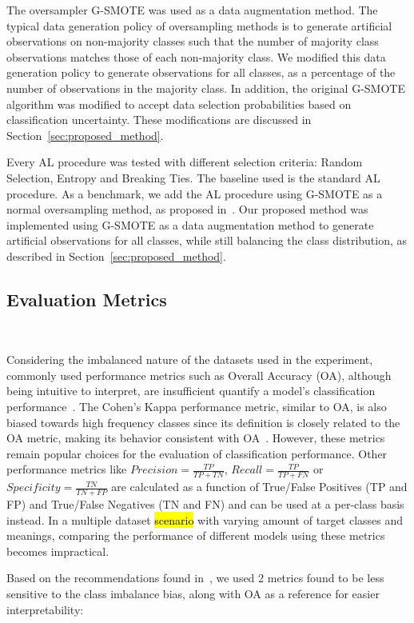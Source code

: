 \documentclass[preprint, 12pt]{elsarticle}
\begin{document}
The oversampler G-SMOTE was used as a data augmentation method. The typical
data generation policy of oversampling methods is to generate artificial
observations on non-majority classes such that the number of majority class
observations matches those of each non-majority class. We modified this data
generation policy to generate observations for all classes, as a percentage of
the number of observations in the majority class. In addition, the original
G-SMOTE algorithm was modified to accept data selection probabilities based on
classification uncertainty. These modifications are discussed in
Section~\ref{sec:proposed_method}.

Every AL procedure was tested with different selection criteria: Random
Selection, Entropy and Breaking Ties. The baseline used is the standard AL
procedure. As a benchmark, we add the AL procedure using G-SMOTE as a normal
oversampling method, as proposed in~\cite{Fonseca2021}. Our proposed method
was implemented using G-SMOTE as a data augmentation method to generate
artificial observations for all classes, while still balancing the class
distribution, as described in Section~\ref{sec:proposed_method}. 
 
\subsection{Evaluation Metrics}~\label{sec:evaluation_metrics}

Considering the imbalanced nature of the datasets used in the experiment,
commonly used performance metrics such as Overall Accuracy (OA), although
being intuitive to interpret, are insufficient quantify a model's
classification performance~\cite{Jeni2013}. The Cohen's Kappa performance
metric, similar to OA, is also biased towards high frequency classes since its
definition is closely related to the OA metric, making its behavior consistent
with OA~\cite{Fatourechi2008}. However, these metrics remain popular choices
for the evaluation of classification performance. Other performance metrics
like $Precision = \frac{TP}{TP+TN}$, $Recall = \frac{TP}{TP+FN}$ or
$Specificity = \frac{TN}{TN + FP}$ are calculated as a function of True/False
Positives (TP and FP) and True/False Negatives (TN and FN) and can be used at
a per-class basis instead. In a multiple dataset \hl{scenario} with varying
amount of target classes and meanings, comparing the performance of different
models using these metrics becomes impractical.
 
Based on the recommendations found in~\cite{Jeni2013, Kubat1997}, we used 2
metrics found to be less sensitive to the class imbalance bias, along with OA
as a reference for easier interpretability:
\end{document}
